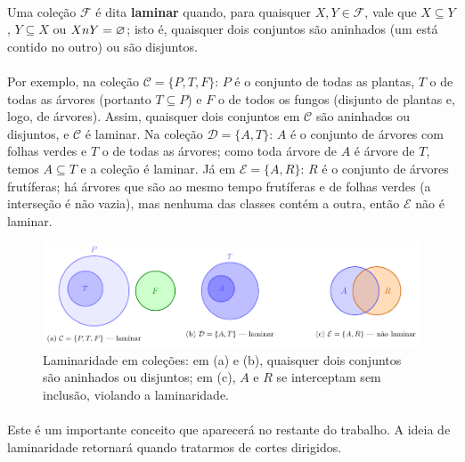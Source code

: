 \documentclass[12pt,a4paper]{article}
\def\cap{\string n}%
\begin{document}
\paragraph{}
Uma coleção \(\mathcal{F}\) é dita \textbf{laminar} quando, para quaisquer \(X, Y \in \mathcal{F}\), vale que \(X \subseteq Y\), \(Y \subseteq X\) ou \(X \cap Y = \varnothing\); isto é, quaisquer dois conjuntos são aninhados (um está contido no outro) ou são disjuntos. 

\paragraph{}
Por exemplo, na coleção \(\mathcal{C} = \{P, T, F\}\): \(P\) é o conjunto de todas as plantas, \(T\) o de todas as árvores (portanto \(T\subseteq P\)) e \(F\) o de todos os fungos (disjunto de plantas e, logo, de árvores). Assim, quaisquer dois conjuntos em \(\mathcal{C}\) são aninhados ou disjuntos, e \(\mathcal{C}\) é laminar. Na coleção \(\mathcal{D} = \{A, T\}\): \(A\) é o conjunto de árvores com folhas verdes e \(T\) o de todas as árvores; como toda árvore de \(A\) é árvore de \(T\), temos \(A\subseteq T\) e a coleção é laminar. Já em \(\mathcal{E} = \{A, R\}\): \(R\) é o conjunto de árvores frutíferas; há árvores que são ao mesmo tempo frutíferas e de folhas verdes (a interseção é não vazia), mas nenhuma das classes contém a outra, então \(\mathcal{E}\) não é laminar.


\begin{figure}[H]
    \centering
    \includegraphics[width=0.9\linewidth]{figures/fig_laminaridade.pdf}

    \caption{Laminaridade em coleções: em (a) e (b), quaisquer dois conjuntos são aninhados ou disjuntos; em (c), $A$ e $R$ se interceptam sem inclusão, violando a laminaridade.}
    \label{fig:laminaridade}\end{figure}


\paragraph{}
Este é um importante conceito que aparecerá no restante do trabalho. A ideia de laminaridade retornará quando tratarmos de cortes dirigidos.
\end{document}
